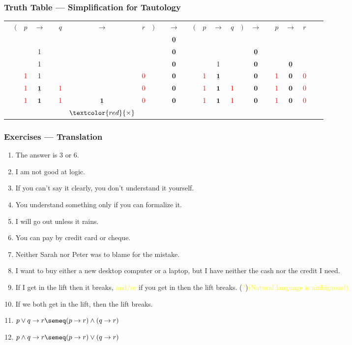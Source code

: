 \documentclass[UTF8,aspectratio=43,11pt,colorlinks,compress,openany]{beamer}%
\begin{document}
\begin{frame}\frametitle{Truth Table --- Simplification for Tautology}
	\begin{table}\huge
		\tabcolsep=2pt
		\begin{tabu}{*{24}c}
			&$($&$p$&$\to$&&$q$&$\to$ &$r$&$)$&&$\to$ &&$($&$p$&$\to$ &$q$&$)$&$\to$&&$p$&$\to$ &$r$&&\\
			&&&&&&&&&&$\underline{\mathbf{0}}$&&&&&&&&&&&&&\\
			&&&1&&&&&&&$\mathbf{0}$&&&&&&&$\underline{\mathbf{0}}$&&&&&&\\
			&&&1&&&&&&&$\mathbf{0}$&&&&1&&&$\mathbf{0}$&&&$\underline{\mathbf{0}}$&&&\\
			&&\textcolor{red}{1}&1&&&&\textcolor{red}{0}&&&$\mathbf{0}$&&&\textcolor{red}{1}&$\underline{\mathbf{1}}$&&&$\mathbf{0}$&&\textcolor{red}{1}&$\mathbf{0}$&\textcolor{red}{0}&&\\
			&&\textcolor{red}{1}&$\underline{\mathbf{1}}$&&\textcolor{red}{1}&&\textcolor{red}{0}&&&$\mathbf{0}$&&&\textcolor{red}{1}&$\mathbf{1}$&\textcolor{red}{1}&&$\mathbf{0}$&&\textcolor{red}{1}&$\mathbf{0}$&\textcolor{red}{0}&&\\
			&&\textcolor{red}{1}&$\mathbf{1}$&&\textcolor{red}{1}&$\underline{\mathbf{1}}$&\textcolor{red}{0}&&&$\mathbf{0}$&&&\textcolor{red}{1}&$\mathbf{1}$&\textcolor{red}{1}&&$\mathbf{0}$&&\textcolor{red}{1}&$\mathbf{0}$&\textcolor{red}{0}&&\\
			&&&&&&$\textcolor{red}{\times}$&&&&&&&&&&&&&&&&&
		\end{tabu}
	\end{table}
\end{frame}

\begin{frame}\frametitle{Exercises --- Translation}
		\begin{enumerate}
			\item The answer is $3$ or $6$.
			\item I am not good at logic.
			\item If you can't say it clearly, you don't understand it yourself.
			\item You understand something only if you can formalize it.
			\item I will go out unless it rains.
			\item You can pay by credit card or cheque.
			\item Neither Sarah nor Peter was to blame for the mistake.
			\item I want to buy either a new desktop computer or a laptop, but I have neither the cash nor the credit I need.
			\item If I get in the lift then it breaks, \textcolor{yellow}{and/or} if you get in then the lift breaks. (\textcolor{yellow}{?})\hfill \textcolor{yellow}{(Natural language is ambiguous!)}
			\item If we both get in the lift, then the lift breaks.
			\item $p\vee q\to r\semeq(p\to r)\wedge(q\to r)$
			\item $p\wedge q\to r\semeq(p\to r)\vee(q\to r)$
		\end{enumerate}
\end{frame}
\end{document}
